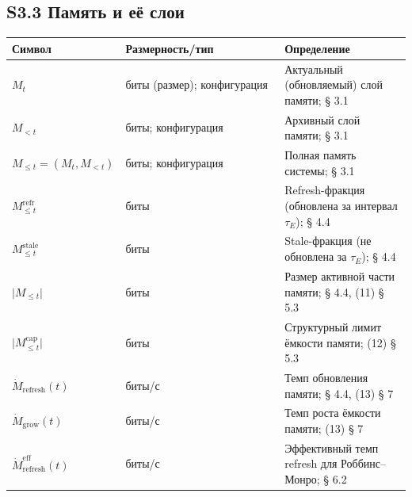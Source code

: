 \documentclass[pdflatex,sn-mathphys-ay]{sn-jnl}
\providecommand{\lt}{<}\providecommand{\gt}{>}
\begin{document}
\subsection*{S3.3 Память и её слои}\label{s3.3-ux43fux430ux43cux44fux442ux44c-ux438-ux435ux451-ux441ux43bux43eux438}



\begin{center}\small
\begin{tabular}{@{} >{\raggedright\arraybackslash}p{0.2105\linewidth} >{\raggedright\arraybackslash}p{0.4474\linewidth} >{\raggedright\arraybackslash}p{0.3421\linewidth}@{}}
\toprule

\begin{minipage}[b]{\linewidth}\raggedright

Символ

\end{minipage} & \begin{minipage}[b]{\linewidth}\raggedright

Размерность/тип

\end{minipage} & \begin{minipage}[b]{\linewidth}\raggedright

Определение

\end{minipage} \\

\midrule

\(M_t\) & биты (размер); конфигурация & Актуальный (обновляемый) слой памяти; § 3.1 \\

\(M_{\lt t}\) & биты; конфигурация & Архивный слой памяти; § 3.1 \\

\(M_{\le t} = (M_t, M_{\lt t})\) & биты; конфигурация & Полная память системы; § 3.1 \\

\(M_{\le t}^{\text{refr}}\) & биты & Refresh-фракция (обновлена за интервал \(\tau_E\)); § 4.4 \\

\(M_{\le t}^{\text{stale}}\) & биты & Stale-фракция (не обновлена за \(\tau_E\)); § 4.4 \\

\(\lvert M_{\le t}\rvert\) & биты & Размер активной части памяти; § 4.4, (11) § 5.3 \\

\(\lvert M_{\le t}^{\text{cap}}\rvert\) & биты & Структурный лимит ёмкости памяти; (12) § 5.3 \\

\(\dot{M}_{\text{refresh}}(t)\) & биты/с & Темп обновления памяти; § 4.4, (13) § 7 \\

\(\dot{M}_{\text{grow}}(t)\) & биты/с & Темп роста ёмкости памяти; (13) § 7 \\

\(\dot{M}_{\text{refresh}}^{\text{eff}}(t)\) & биты/с & Эффективный темп refresh для Роббинс--Монро; § 6.2 \\

\bottomrule
\end{tabular}
\end{center}
\end{document}
